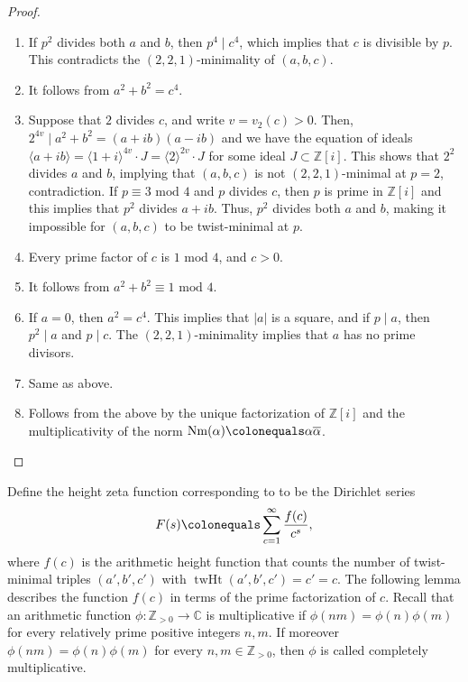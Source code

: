 \documentclass[12pt]{amsart}
\numberwithin{equation}{section} %
\theoremstyle{definition} \newtheorem{definition}[counter]{Definition}
\theoremstyle{remark} \newtheorem{nonexam}[counter]{Non-example}
\newcommand{\ZZ}{\mathbb{Z}} %
\newcommand{\CC}{\mathbb{C}} %
\newcommand{\md}{\text{ mod }} %
\newcommand{\cdef}[1]{\textsf{#1}} %
\newcommand{\ol}{\overline}
\DeclareMathOperator{\Nm}{Nm} %
\DeclareMathOperator{\twht}{twHt} %
\begin{document}
\begin{proof}
  \hfill
  \begin{enumerate}[label=(\alph*)]
  \item If $p^2$ divides both $a$ and $b$, then $p^4 \mid c^4$, which
    implies that $c$ is divisible by $p$. This contradicts the
    $(2,2,1)$-minimality of $(a,b,c)$.
  \item It follows from $a^2 + b^2 = c^4$.
  \item Suppose that $2$ divides $c$, and write $v = v_2(c) > 0$. Then,
    $2^{4v} \mid a^2 + b^2 = (a+ib)(a-ib)$ and we have the equation of ideals
    $\langle a+ib\rangle = \langle 1+i\rangle^{4v}\cdot J = \langle
    2\rangle^{2v}\cdot J$ for some ideal $J \subset \ZZ[i]$. This shows that
    $2^2$ divides $a$ and $b$, implying that $(a,b,c)$ is not $(2,2,1)$-minimal
    at $p=2$, contradiction. If $p \equiv 3 \md 4$ and $p$ divides $c$, then
    $p$ is prime in $\ZZ[i]$ and this implies that $p^{2}$ divides $a + ib$.
    Thus, $p^2$ divides both $a$ and $b$, making it impossible for $(a,b,c)$ to
    be twist-minimal at $p$.
  \item Every prime factor of $c$ is $1 \md 4$, and $c > 0$.
  \item It follows from $a^2 + b^2 \equiv 1 \md 4$.
  \item If $a = 0$, then $a^2 = c^4$. This implies that $|a|$ is a
    square, and if $p \mid a$, then $p^2 \mid a$ and $p \mid c$. The
    $(2,2,1)$-minimality implies that $a$ has no prime divisors.
  \item Same as above.
  \item Follows from the above by the unique factorization of $\ZZ[i]$ and the
    multiplicativity of the norm $\Nm(\alpha) \colonequals \alpha\ol{\alpha}$.
  \end{enumerate}
\end{proof}

Define the \cdef{height zeta function} corresponding to 
to be the Dirichlet series
\begin{equation*}
  F(s) \colonequals \sum_{c = 1}^\infty \dfrac{f(c)}{c^s},
\end{equation*}
where $f(c)$ is the \cdef{arithmetic height function} that counts the number of
twist-minimal triples $(a',b',c')$ with $\twht(a',b',c') = c' = c$. The
following lemma describes the function $f(c)$ in terms of the prime
factorization of $c$. Recall that an arithmetic function $\phi \colon \ZZ_{>0}
\to \CC$ is \cdef{multiplicative} if $\phi(nm) = \phi(n)\phi(m)$ for every
relatively prime positive integers $n,m$. If moreover $\phi(nm)=\phi(n)\phi(m)$
for every $n,m \in \ZZ_{>0}$, then $\phi$ is called \cdef{completely
multiplicative}.
\end{document}

